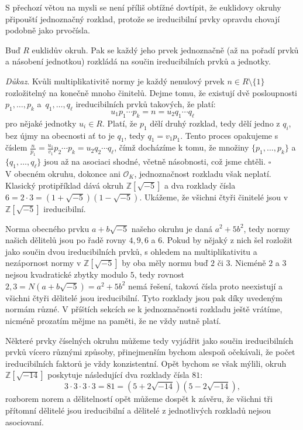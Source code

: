 \documentclass[12pt]{report}
\begin{document}
S přechozí větou na mysli se není příliš obtížné dovtípit, že euklidovy okruhy připouští jednoznačný rozklad, protože se ireducibilní prvky opravdu chovají podobně jako prvočísla.

\begin{dusledek}
Buď $R$ euklidův okruh. Pak se každý jeho prvek jednoznačně (až na pořadí prvků a násobení jednotkou) rozkládá na součin ireducibilních prvků a jednotky.
\end{dusledek}
\noindent \textit{Důkaz}. Kvůli multiplikativitě normy je každý nenulový prvek $n \in R \setminus \lbrace 1 \rbrace$ rozložitelný na konečně mnoho činitelů. Dejme tomu, že existují dvě posloupnosti $p_1, \dots, p_k$ a~$q_1,\dots, q_{\ell}$ ireducibilních prvků takových, že platí:
\begin{equation*}
u_1 p_1 \cdots p_k = n = u_2 q_1 \cdots q_{\ell}
\end{equation*}
pro nějaké jednotky $u_i \in R$. Platí, že $p_1$ dělí druhý rozklad, tedy dělí jedno z $q_i$, bez újmy na obecnosti ať to je $q_1$, tedy $q_1 = v_1 p_1$. Tento proces opakujeme s číslem $\frac{n}{p_1} =\frac{u_1}{v_1} p_2 \cdots p_k = u_2 q_2 \cdots q_{\ell}$, čímž docházíme k tomu, že množiny $\lbrace p_1, \dots, p_k \rbrace$ a~$\lbrace q_1,\dots,q_{\ell} \rbrace$ jsou až na asociaci shodné, včetně násobnosti, což jsme chtěli. \hfill $\square$\\
 
V obecném okruhu, dokonce ani $\mathcal{O}_K$, jednoznačnost rozkladu však neplatí. Klasický protipříklad dává okruh $\mathbb{Z}[\sqrt{-5}]$ a dva rozklady čísla $6 = 2 \cdot 3 = (1+\sqrt{-5})(1-\sqrt{-5})$. Ukážeme, že všichni čtyři činitelé jsou v $\mathbb{Z}[\sqrt{-5}]$ ireducibilní.

Norma obecného prvku $a+b\sqrt{-5}$ našeho okruhu je daná $a^2+5b^2$, tedy normy našich dělitelů jsou po řadě rovny $4,9,6$ a $6$. Pokud by nějaký z nich šel rozložit jako součin dvou ireducibilních prvků, s ohledem na multiplikativitu a nezápornost normy v $\mathbb{Z}[\sqrt{-5}]$ by oba měly normu buď $2$ či $3$. Nicméně $2$ a $3$ nejsou kvadratické zbytky modulo $5$, tedy rovnost $2,3 = N(a+b\sqrt{-5}) = a^2+5b^2$ nemá řešení, taková čísla proto neexistují a všichni čtyři dělitelé jsou ireducibilní. Tyto rozklady jsou pak díky uvedeným normám různé. V příštích sekcích se k jednoznačnosti rozkladu ještě vrátíme, nicméně prozatím mějme na paměti, že ne vždy nutně platí.

Některé prvky číselných okruhu můžeme tedy vyjádřit jako součin ireducibilních prvků vícero různými způsoby, přinejmenším bychom alespoň očekávali, že počet ireducibilních faktorů je vždy konzistentní. Opět bychom se však mýlili, okruh $\mathbb{Z}[\sqrt{-14}]$ poskytuje následující dva rozklady čísla $81$:
\begin{equation*}
3 \cdot 3 \cdot 3 \cdot 3 = 81 = (5+2\sqrt{-14})(5-2\sqrt{-14}),
\end{equation*}
rozborem norem a dělitelností opět můžeme dospět k závěru, že všichni tři přítomní dělitelé jsou ireducibilní a dělitelé z jednotlivých rozkladů nejsou asociovaní.
\end{document}
